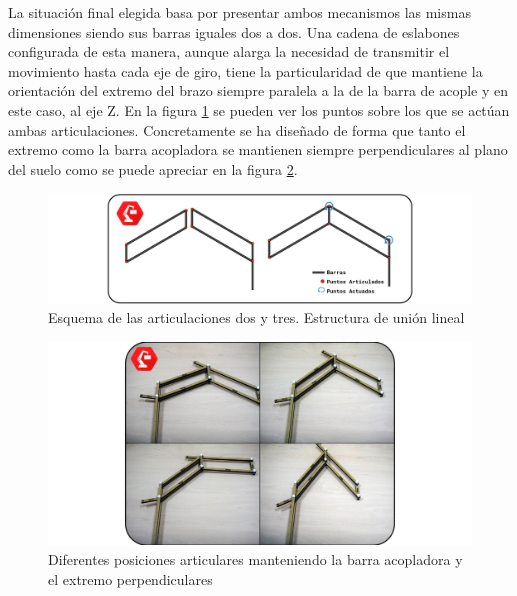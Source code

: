 	La situación final elegida basa por presentar ambos mecanismos las mismas dimensiones siendo sus barras iguales dos a dos. Una cadena de eslabones configurada de esta manera, aunque alarga la necesidad de transmitir el movimiento hasta cada eje de giro, tiene la particularidad de que mantiene la orientación del extremo del brazo siempre paralela a la de la barra de acople y en este caso, al eje Z. En la figura \ref{fig:Mecanica:4_bar_mecanism} se pueden ver los puntos sobre los que se actúan ambas articulaciones. Concretamente se ha diseñado de forma que tanto el extremo como la barra acopladora se mantienen siempre perpendiculares al plano del suelo como se puede apreciar en la figura \ref{fig:Mecanica:movimiento}.
    \\

    \begin{figure}[H]
    	\centering
    	\includegraphics[width=\textwidth]{figuras/Imagenes_Mecanica/mecanismos_4_barras.jpg}
    	\caption{Esquema de las articulaciones dos y tres. Estructura de unión lineal}
    	\label{fig:Mecanica:4_bar_mecanism}
    \end{figure}
    
    
    \begin{figure}[H]
       	\centering
       	\includegraphics[width=\textwidth]{figuras/Imagenes_Mecanica/movimiento_maqueta.jpg}
       	\caption{Diferentes posiciones articulares manteniendo la barra acopladora y el extremo perpendiculares}
       	\label{fig:Mecanica:movimiento}
    \end{figure}

